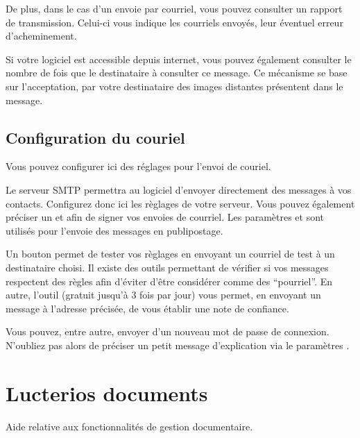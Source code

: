 \documentclass[a4paper,10pt,oneside,french]{sphinxmanual}
\begin{document}
De plus, dans le cas d’un envoie par courriel, vous pouvez consulter un rapport de transmission.
Celui-ci vous indique les courriels envoyés, leur éventuel erreur d’acheminement.

Si votre logiciel est accessible depuis internet, vous pouvez également consulter le nombre de fois que le destinataire à consulter ce message.
Ce mécanisme se base sur l’acceptation, par votre destinataire des images distantes présentent dans le message.

\noindent{}


\section{Configuration du couriel}
\label{\detokenize{mailing/configuration:configuration-du-couriel}}\label{\detokenize{mailing/configuration::doc}}
Vous pouvez configurer ici des réglages pour l’envoi de couriel.

Le serveur SMTP permettra au logiciel d’envoyer directement des messages à vos contacts.
Configurez donc ici les règlages de votre serveur.
Vous pouvez également préciser un  et  afin de signer vos envoies de courriel.
Les paramètres  et  sont utilisés pour l’envoie des messages en publipostage.

Un bouton  permet de tester vos règlages en envoyant un courriel de test à un destinataire choisi.
Il existe des outils permettant de vérifier si vos messages respectent des règles afin d’éviter d’être considérer comme des “pourriel”.
En autre, l’outil  (gratuit jusqu’à 3 fois par jour) vous permet, en envoyant un message à l’adresse précisée, de vous établir une note de confiance.

Vous pouvez, entre autre, envoyer d’un nouveau mot de passe de connexion.
N’oubliez pas alors de préciser un petit message d’explication via le paramètres .


\chapter{Lucterios documents}
\label{\detokenize{documents/index:lucterios-documents}}\label{\detokenize{documents/index::doc}}
Aide relative aux fonctionnalités de gestion documentaire.
\end{document}
